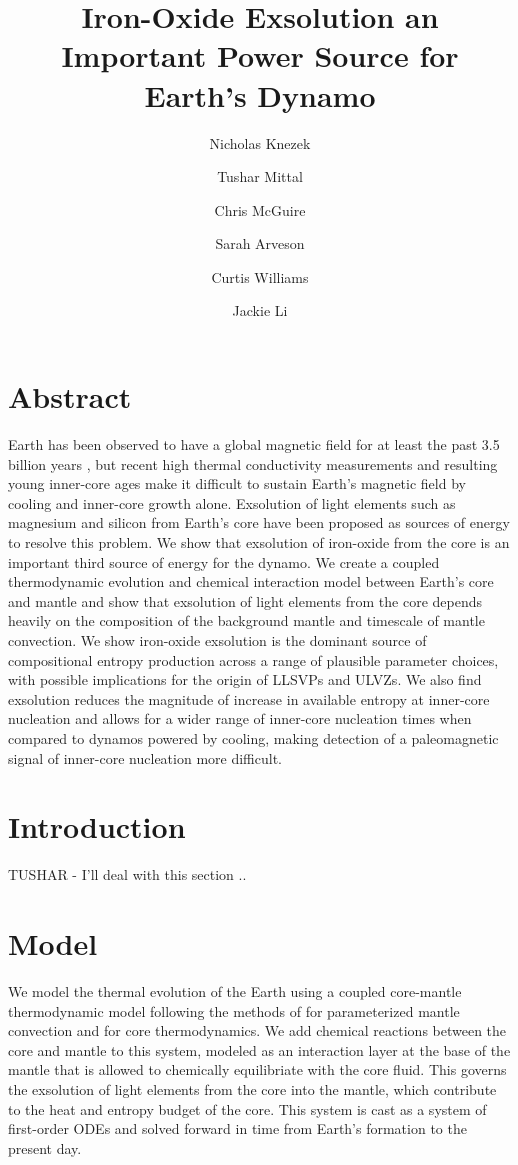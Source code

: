 \documentclass[]{article}
\title{Iron-Oxide Exsolution an Important Power Source for Earth's Dynamo}
\author{Nicholas Knezek
	\and Tushar Mittal
	\and Chris McGuire 
	\and Sarah Arveson
	\and Curtis Williams 
	\and Jackie Li}
\date{}
\begin{document}
	\maketitle
	
	\section{Abstract}\label{abstract}
	Earth has been observed to have a global magnetic field for at least the past 3.5 billion years \citep{Tarduno2015}, but recent high thermal conductivity measurements \citep{Pozzo2012} and resulting young inner-core ages \citep{Labrosse2015} make it difficult to sustain Earth's magnetic field by cooling and inner-core growth alone. Exsolution of light elements such as magnesium \citep{Badro2016,ORourke2016a} and silicon \citep{Hirose2017} from Earth's core have been proposed as sources of energy to resolve this problem. We show that exsolution of iron-oxide from the core is an important third source of energy for the dynamo. We create a coupled thermodynamic evolution and chemical interaction model between Earth's core and mantle and show that exsolution of light elements from the core depends heavily on the composition of the background mantle and timescale of mantle convection. We show iron-oxide exsolution is the dominant source of compositional entropy production across a range of plausible parameter choices, with possible implications for the origin of LLSVPs and ULVZs.  We also find exsolution reduces the magnitude of increase in available entropy at inner-core nucleation and allows for a wider range of inner-core nucleation times when compared to dynamos powered by cooling, making detection of a paleomagnetic signal of inner-core nucleation more difficult. 
	
	\section{Introduction}\label{introduction}
	

	TUSHAR - I'll deal with this section ..
	
	\section{Model}\label{model}
	We model the thermal evolution of the Earth using a coupled core-mantle
	thermodynamic model following the methods of \citet{Stevenson1983} for
	parameterized mantle convection and \citet{Nimmo2015} for core
	thermodynamics. We add chemical reactions between the core and mantle to
	this system, modeled as an interaction layer at the base of the mantle
	that is allowed to chemically equilibriate with the core fluid. This
	governs the exsolution of light elements from the core into the mantle,
	which contribute to the heat and entropy budget of the core. This system
	is cast as a system of first-order ODEs and solved forward in time from Earth's
	formation to the present day.
	
\end{document}
